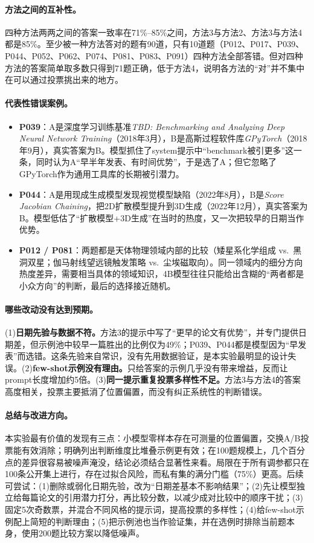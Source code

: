 \documentclass{article}
\begin{document}
\paragraph{方法之间的互补性。}四种方法两两之间的答案一致率在71\%--85\%之间，方法3与方法2、方法3与方法4都是85\%。至少被一种方法答对的题有90道，只有10道题（P012、P017、P039、P044、P052、P062、P074、P081、P083、P091）四种方法全部答错。但对四种方法的答案简单取多数只得到71题正确，低于方法4，说明各方法的“对”并不集中在可以通过投票挑出来的地方。

\paragraph{代表性错误案例。}
\begin{itemize}
\item \textbf{P039}：A是深度学习训练基准\emph{TBD: Benchmarking and Analyzing Deep Neural Network Training}（2018年3月），B是高斯过程软件库\emph{GPyTorch}（2018年9月），真实答案为B。模型抓住了system提示中“benchmark被引更多”这一条，同时认为A“早半年发表、有时间优势”，于是选了A；但它忽略了GPyTorch作为通用工具库的长期被引潜力。
\item \textbf{P044}：A是用现成生成模型发现视觉模型缺陷（2022年8月），B是\emph{Score Jacobian Chaining}，把2D扩散模型提升到3D生成（2022年12月），真实答案为B。模型低估了“扩散模型+3D生成”在当时的热度，又一次把较早的日期当作优势。
\item \textbf{P012 / P081}：两题都是天体物理领域内部的比较（矮星系化学组成 vs.\ 黑洞双星；伽马射线望远镜触发策略 vs.\ 尘埃磁取向）。同一领域内的细分方向热度差异，需要相当具体的领域知识，4B模型往往只能给出含糊的“两者都是小众方向”的判断，最后的选择接近随机。
\end{itemize}

\paragraph{哪些改动没有达到预期。}(1)\textbf{日期先验与数据不符。}方法3的提示中写了“更早的论文有优势”，并专门提供日期差，但示例池中较早一篇胜出的比例仅为49\%；P039、P044都是模型因为“早发表”而选错。这条先验来自常识，没有先用数据验证，是本实验最明显的设计失误。(2)\textbf{few-shot示例没有理由。}只给答案的示例几乎没有带来增益，反而让prompt长度增加约5倍。(3)\textbf{同一提示重复投票多样性不足。}方法3与方法4的答案高度相关，投票主要抵消了位置偏置，而没有纠正系统性的判断错误。

\paragraph{总结与改进方向。}本实验最有价值的发现有三点：小模型零样本存在可测量的位置偏置，交换A/B投票能有效消除；明确列出判断维度比堆叠示例更有效；在100题规模上，几个百分点的差异很容易被噪声淹没，结论必须结合显著性来看。局限在于所有调参都只在100条公开集上进行，存在过拟合风险，而私有集的满分门槛（75\%）更高。后续可尝试：(1)删除或弱化日期先验，改为“日期差基本不影响结果”；(2)先让模型独立给每篇论文的引用潜力打分，再比较分数，以减少成对比较中的顺序干扰；(3)固定5次奇数票，并混合不同风格的提示词，提高投票的多样性；(4)给few-shot示例配上简短的判断理由；(5)把示例池也当作验证集，并在选例时排除当前题本身，使用200题比较方案以降低噪声。
\end{document}
